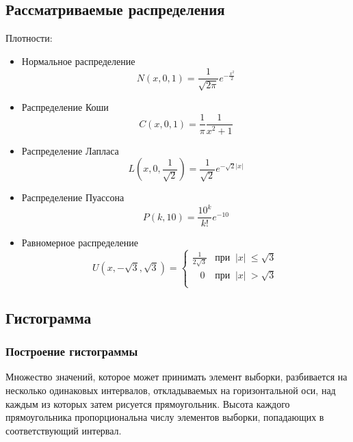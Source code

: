 \documentclass[a4paper]{article}
\begin{document}
        \subsection{Рассматриваемые распределения}
            Плотности:
            \begin{itemize}
                \item Нормальное распределение
                \begin{equation}\label{eq:norm}
                    N(x,0,1)=\frac{1}{\sqrt{2\pi}}e^{-\frac{x^2}{2}}
                \end{equation}
                \item Распределение Коши
                \begin{equation}\label{eq:cauchy}
                    C(x, 0, 1)=\frac{1}{\pi}\frac{1}{x^2+1}
                \end{equation}
                \item Распределение Лапласа
                \begin{equation}\label{eq:laplace}
                    L(x,0,\frac{1}{\sqrt{2}})=\frac{1}{\sqrt{2}}e^{-\sqrt{2}|x|}
                \end{equation}
                \item Распределение Пуассона
                \begin{equation}\label{eq:poisson}
                    P(k, 10)=\frac{10^k}{k!}e^{-10}
                \end{equation}
                \item Равномерное распределение
                \begin{equation}\label{eq:uniform}
                    U(x,-\sqrt{3},\sqrt{3})=
                    \begin{cases}
                    \displaystyle\frac{1}{2\sqrt{3}}&\text{при}\;\;|x|\:\leq\sqrt{3}\\
                    \;\;\;0&\text{при}\;\;|x|\:>\sqrt{3}\\
                    \end{cases}
                \end{equation}
            \end{itemize}
        \subsection{Гистограмма}
            \subsubsection{Построение гистограммы}
                Множество значений, которое может принимать элемент выборки, разбивается на несколько одинаковых интервалов, откладываемых на горизонтальной оси, над каждым из которых затем рисуется прямоугольник.
                Высота каждого прямоугольника пропорциональна числу элементов выборки, попадающих в соответствующий интервал.
\end{document}
